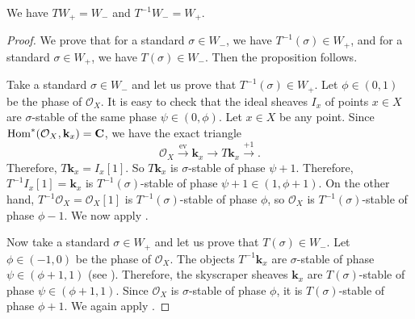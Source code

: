 \documentclass{amsart}
\begin{document}
\begin{proposition}\label{prop:T12}
  We have \(T W_+ = W_{-}\) and \(T^{-1} W_- = W_{+}\).
\end{proposition}
\begin{proof}
  We prove that for a standard \(\sigma \in W_-\), we have \(T^{-1}(\sigma) \in W_{+}\), and for a standard \(\sigma \in W_{+}\), we have \(T(\sigma) \in W_-\).
  Then the proposition follows.
  
  Take a standard \(\sigma \in W_-\)  and let us prove that \(T^{-1}(\sigma) \in W_{+}\).
  Let \(\phi \in (0,1)\) be the phase of \(\mathcal{O}_X\).
  It is easy to check that the ideal sheaves \(I_x\) of points \(x \in X\) are \(\sigma\)-stable of the same phase \(\psi \in (0,\phi)\).
  Let \(x \in X\) be any point.
  Since \(\operatorname{Hom}^{*}(\mathcal{O}_X, \mathbf{k}_x) = \mathbf{C}\), we have the exact triangle
  \[ \mathcal{O}_X \xrightarrow{\textrm{ev}} \mathbf{k}_x \to T \mathbf{k}_x \xrightarrow{+1}.\]
  Therefore, \( T \mathbf{k}_x = I_x[1]\).
  So \(T \mathbf{k}_x\) is \(\sigma\)-stable of phase \(\psi+1\).
  Therefore, \(T^{-1}I_x [1] = \mathbf{k}_x\) is \(T^{-1}(\sigma)\)-stable of phase \(\psi + 1 \in (1, \phi+1)\).
  On the other hand, \(T^{-1} \mathcal{O}_X = \mathcal{O}_X[1]\) is \(T^{-1}(\sigma)\)-stable of phase \(\phi\), so \(\mathcal{O}_X\) is \(T^{-1}(\sigma)\)-stable of phase \(\phi-1\).
  We now apply .

  Now take a standard \(\sigma \in W_+\)  and let us prove that \(T(\sigma) \in W_{-}\).
  Let \(\phi \in (-1,0)\)  be the phase of \(\mathcal{O}_{X}\).
  The objects \(T^{-1} \mathbf{k}_x\) are \(\sigma\)-stable of phase \(\psi \in (\phi+1,1)\)  (see \cite[Remark~4.3 (i)]{huy.mac.ste:08}).
  Therefore, the skyscraper sheaves \(\mathbf{k}_x\) are \(T(\sigma)\)-stable of phase \(\psi \in (\phi+1,1)\).
  Since \(\mathcal{O}_X\) is \(\sigma\)-stable of phase \(\phi\), it is \(T(\sigma)\)-stable of phase \(\phi+1\).
  We again apply .
\end{proof}
\end{document}
